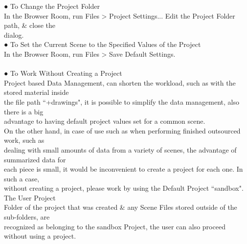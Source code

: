 \documentclass[a4paper,10pt]{article}
\begin{document}
\noindent● To Change the Project Folder\\
\normalsize
In the Browser Room, run Files > Project Settings... Edit the Project Folder path, \& close the\\
dialog.\\
\large
● To Set the Current Scene to the Specified Values of the Project\\
\normalsize
In the Browser Room, run Files > Save Default Settings.\\
\\[0.5em]
\large
● To Work Without Creating a Project\\
\normalsize
Project based Data Management, can shorten the workload, such as with the stored material inside\\
the file path “+drawings", it is possible to simplify the data management, also there is a big\\
advantage to having default project values set for a common scene.\\
On the other hand, in case of use such as when performing finished outsourced work, such as\\
dealing with small amounts of data from a variety of scenes, the advantage of summarized data for\\
each piece is small, it would be inconvenient to create a project for each one. In such a case,\\
without creating a project, please work by using the Default Project “sandbox". The User Project\\
Folder of the project that was created \& any Scene Files stored outside of the sub-folders, are\\
recognized as belonging to the sandbox Project, the user can also proceed without using a project.\\
\end{document}
